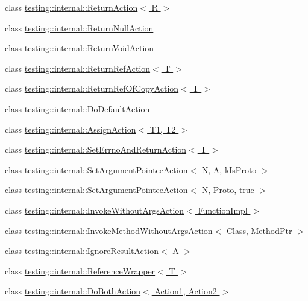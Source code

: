 \begin{DoxyCompactItemize}
class \hyperlink{classtesting_1_1internal_1_1ReturnAction}{testing\+::internal\+::\+Return\+Action$<$ R $>$}
\item 
class \hyperlink{classtesting_1_1internal_1_1ReturnNullAction}{testing\+::internal\+::\+Return\+Null\+Action}
\item 
class \hyperlink{classtesting_1_1internal_1_1ReturnVoidAction}{testing\+::internal\+::\+Return\+Void\+Action}
\item 
class \hyperlink{classtesting_1_1internal_1_1ReturnRefAction}{testing\+::internal\+::\+Return\+Ref\+Action$<$ T $>$}
\item 
class \hyperlink{classtesting_1_1internal_1_1ReturnRefOfCopyAction}{testing\+::internal\+::\+Return\+Ref\+Of\+Copy\+Action$<$ T $>$}
\item 
class \hyperlink{classtesting_1_1internal_1_1DoDefaultAction}{testing\+::internal\+::\+Do\+Default\+Action}
\item 
class \hyperlink{classtesting_1_1internal_1_1AssignAction}{testing\+::internal\+::\+Assign\+Action$<$ T1, T2 $>$}
\item 
class \hyperlink{classtesting_1_1internal_1_1SetErrnoAndReturnAction}{testing\+::internal\+::\+Set\+Errno\+And\+Return\+Action$<$ T $>$}
\item 
class \hyperlink{classtesting_1_1internal_1_1SetArgumentPointeeAction}{testing\+::internal\+::\+Set\+Argument\+Pointee\+Action$<$ N, A, k\+Is\+Proto $>$}
\item 
class \hyperlink{classtesting_1_1internal_1_1SetArgumentPointeeAction_3_01N_00_01Proto_00_01true_01_4}{testing\+::internal\+::\+Set\+Argument\+Pointee\+Action$<$ N, Proto, true $>$}
\item 
class \hyperlink{classtesting_1_1internal_1_1InvokeWithoutArgsAction}{testing\+::internal\+::\+Invoke\+Without\+Args\+Action$<$ Function\+Impl $>$}
\item 
class \hyperlink{classtesting_1_1internal_1_1InvokeMethodWithoutArgsAction}{testing\+::internal\+::\+Invoke\+Method\+Without\+Args\+Action$<$ Class, Method\+Ptr $>$}
\item 
class \hyperlink{classtesting_1_1internal_1_1IgnoreResultAction}{testing\+::internal\+::\+Ignore\+Result\+Action$<$ A $>$}
\item 
class \hyperlink{classtesting_1_1internal_1_1ReferenceWrapper}{testing\+::internal\+::\+Reference\+Wrapper$<$ T $>$}
\item 
class \hyperlink{classtesting_1_1internal_1_1DoBothAction}{testing\+::internal\+::\+Do\+Both\+Action$<$ Action1, Action2 $>$}
\end{DoxyCompactItemize}
